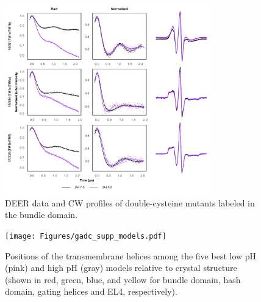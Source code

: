 \begin{figure}[h]
\centering
\includegraphics[width=3.5in]{Figures/gadc_supp_bundle_only.pdf}
\caption[DEER data and CW profiles of double-cysteine mutants labeled in the bundle domain.]{DEER data and CW profiles of double-cysteine mutants labeled in the bundle domain.}
\label{fig:gadc_supp_bundle_only}
\end{figure}

\begin{figure}[h]
\centering
\texttt{[image: Figures/gadc\_supp\_models.pdf]}
\caption[Positions of the transmembrane helices among the five best low pH (pink) and high pH (gray) models relative to crystal structure (shown in red, green, blue, and yellow for bundle domain, hash domain, gating helices and EL4, respectively).]{Positions of the transmembrane helices among the five best low pH (pink) and high pH (gray) models relative to crystal structure (shown in red, green, blue, and yellow for bundle domain, hash domain, gating helices and EL4, respectively).}
\label{fig:gadc_supp_models}
\end{figure}

